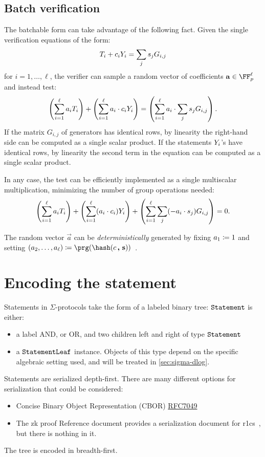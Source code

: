 \documentclass[11pt]{article}
\begin{document}
\subsection{Batch verification}

The batchable form can take advantage of the following fact.
Given the single verification equations of the form:
\[
   T_i + c_i Y_i = \sum_j s_j G_{i,j}
\]
for $i=1, \dots,\ell$,
the verifier can sample a random vector of coefficients $\vec a \in \FF_p^\ell$ and instead test:
\[
  \left(\sum_{i=1}^{\ell} a_i T_i\right) + \left(\sum_{i=1}^{\ell} a_i \cdot  c_i Y_i \right) = \left(\sum_{i=1}^{\ell} a_i \cdot \sum_j s_j G_{i,j}\right).
\]
If the matrix $G_{i, j}$ of generators has identical rows, by linearity the right-hand side can be computed as a single scalar product.
If the statements $Y_i$'s have identical rows, by linearity the second term in the equation can be computed as a single scalar product.

In any case, the test can be efficiently implemented as a single multiscalar multiplication, minimizing the number of group operations needed:
\[
  \left(\sum_{i=1}^{\ell} a_i T_i\right) + \left(\sum_{i=1}^{\ell} (a_i \cdot  c_i) Y_i \right) + \left(\sum_{i=1}^{\ell}\sum_j (-a_i \cdot  s_j) G_{i,j}\right) = 0.
\]

The random vector $\vec a$ can be \emph{deterministically} generated by fixing $a_1 \coloneqq 1$ and setting $(a_2, \dots, a_{\ell}) \defeq \prg(\hash(\challenge \concat \vec s))$~\cite{bip-schnorr}.

\section{Encoding the statement}

Statements in $\Sigma$-protocols take the form of a labeled binary tree:
$\texttt{Statement}$ is either:
\begin{itemize}
  \item a label \textsf{AND}, or \textsf{OR}, and two children \textsf{left} and \textsf{right} of type $\texttt{Statement}$
  \item a $\texttt{StatementLeaf}$ instance. Objects of this type depend on the specific algebraic setting used, and will be treated in \cref{sec:sigma-dlog}.
\end{itemize}
Statements are serialized depth-first.
  There are many different options for serialization that could be considered:
  \begin{itemize}
  \item Concise Binary Object Representation (CBOR) \href{https://datatracker.ietf.org/doc/html/rfc7049}{RFC7049}
    \item The zk proof Reference document provides a serialization document for r1cs~\cite[3.4.2]{zkproof-reference}, but there is nothing in it.
\end{itemize}
The tree is encoded in breadth-first.
\end{document}
